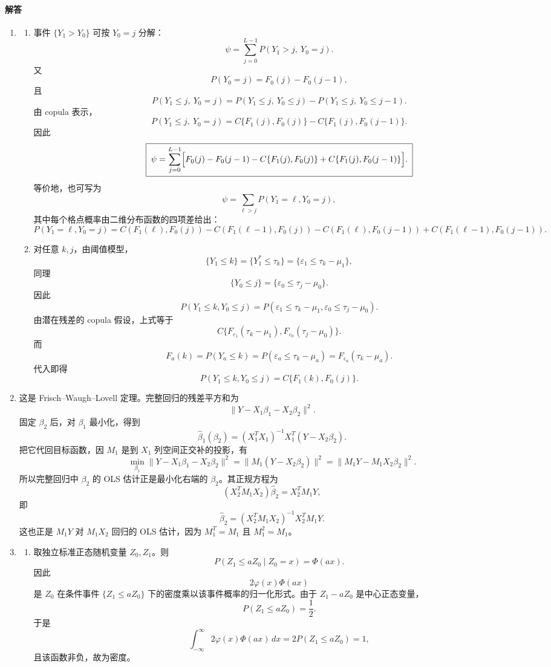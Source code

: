 \documentclass[UTF8,12pt]{ctexart}
\begin{document}
\paragraph{解答}
\begin{enumerate}[label=\textbf{\arabic*.},leftmargin=2.2em]
\item
\begin{enumerate}[label=\textbf{(\arabic*)},leftmargin=2.4em]
\item 事件 \(\{Y_1>Y_0\}\) 可按 \(Y_0=j\) 分解：
\[
\psi=\sum_{j=0}^{L-1}P(Y_1>j,\ Y_0=j).
\]
又
\[
P(Y_0=j)=F_0(j)-F_0(j-1),
\]
且
\[
P(Y_1\le j,\ Y_0=j)
=P(Y_1\le j,\ Y_0\le j)-P(Y_1\le j,\ Y_0\le j-1).
\]
由 copula 表示，
\[
P(Y_1\le j,\ Y_0=j)
=C\{F_1(j),F_0(j)\}-C\{F_1(j),F_0(j-1)\}.
\]
因此
\[
\boxed{\;
\psi=\sum_{j=0}^{L-1}
\Bigl[F_0(j)-F_0(j-1)
-C\{F_1(j),F_0(j)\}
+C\{F_1(j),F_0(j-1)\}\Bigr].
\;}
\]
等价地，也可写为
\[
\psi=\sum_{\ell>j}
P(Y_1=\ell,Y_0=j),
\]
其中每个格点概率由二维分布函数的四项差给出：
\[
P(Y_1=\ell,Y_0=j)
=C(F_1(\ell),F_0(j))-C(F_1(\ell-1),F_0(j))
-C(F_1(\ell),F_0(j-1))+C(F_1(\ell-1),F_0(j-1)).
\]

\item 对任意 \(k,j\)，由阈值模型，
\[
\{Y_1\le k\}=\{Y_1^\ast\le\tau_k\}
=\{\varepsilon_1\le \tau_k-\mu_1\},
\]
同理
\[
\{Y_0\le j\}=\{\varepsilon_0\le \tau_j-\mu_0\}.
\]
因此
\[
P(Y_1\le k,Y_0\le j)
=P(\varepsilon_1\le\tau_k-\mu_1,\varepsilon_0\le\tau_j-\mu_0).
\]
由潜在残差的 copula 假设，上式等于
\[
C\{F_{\varepsilon_1}(\tau_k-\mu_1),
F_{\varepsilon_0}(\tau_j-\mu_0)\}.
\]
而
\[
F_a(k)=P(Y_a\le k)
=P(\varepsilon_a\le\tau_k-\mu_a)
=F_{\varepsilon_a}(\tau_k-\mu_a).
\]
代入即得
\[
P(Y_1\le k,Y_0\le j)=C\{F_1(k),F_0(j)\}.
\]
\end{enumerate}

\item 这是 Frisch--Waugh--Lovell 定理。完整回归的残差平方和为
\[
\|Y-X_1\beta_1-X_2\beta_2\|^2.
\]
固定 \(\beta_2\) 后，对 \(\beta_1\) 最小化，得到
\[
\hat\beta_1(\beta_2)=(X_1^TX_1)^{-1}X_1^T(Y-X_2\beta_2).
\]
把它代回目标函数，因 \(M_1\) 是到 \(X_1\) 列空间正交补的投影，有
\[
\min_{\beta_1}\|Y-X_1\beta_1-X_2\beta_2\|^2
=\|M_1(Y-X_2\beta_2)\|^2
=\|M_1Y-M_1X_2\beta_2\|^2.
\]
所以完整回归中 \(\beta_2\) 的 OLS 估计正是最小化右端的 \(\beta_2\)。其正规方程为
\[
(X_2^TM_1X_2)\hat\beta_2=X_2^TM_1Y,
\]
即
\[
\hat\beta_2=(X_2^TM_1X_2)^{-1}X_2^TM_1Y.
\]
这也正是 \(M_1Y\) 对 \(M_1X_2\) 回归的 OLS 估计，因为 \(M_1^T=M_1\) 且 \(M_1^2=M_1\)。

\item
\begin{enumerate}[label=\textbf{(\alph*)},leftmargin=2.4em]
\item 取独立标准正态随机变量 \(Z_0,Z_1\)。则
\[
P(Z_1\le aZ_0\mid Z_0=x)=\Phi(ax).
\]
因此
\[
2\varphi(x)\Phi(ax)
\]
是 \(Z_0\) 在条件事件 \(\{Z_1\le aZ_0\}\) 下的密度乘以该事件概率的归一化形式。由于 \(Z_1-aZ_0\) 是中心正态变量，
\[
P(Z_1\le aZ_0)=\frac12.
\]
于是
\[
\int_{-\infty}^{\infty}2\varphi(x)\Phi(ax)\,dx
=2P(Z_1\le aZ_0)=1,
\]
且该函数非负，故为密度。


\end{enumerate}
\end{enumerate}
\end{document}
